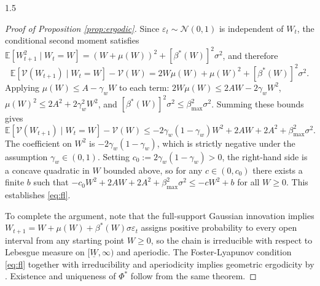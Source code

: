 \documentclass[12pt]{article}
\theoremstyle{definition}
\theoremstyle{plain}
\begin{document}
\begin{spacing}{1.5}
\begin{appendices}
\begin{proof}[Proof of Proposition \ref{prop:ergodic}]
    Since $\varepsilon_t \sim \mathcal{N}(0,1)$ is independent of $W_t$, the conditional second moment satisfies $\mathbb{E}[W_{t+1}^2 \mid W_t = W] = (W + \mu(W))^2 + [\beta^*(W)]^2\sigma^2$, and therefore
    \[
    \mathbb{E}[\mathcal{V}(W_{t+1}) \mid W_t = W] - \mathcal{V}(W) = 2W\mu(W) + \mu(W)^2 + [\beta^*(W)]^2\sigma^2.
    \]
    Applying $\mu(W) \leq A - \gamma_w W$ to each term: $2W\mu(W) \leq 2AW - 2\gamma_w W^2$, $\mu(W)^2 \leq 2A^2 + 2\gamma_w^2 W^2$, and $[\beta^*(W)]^2\sigma^2 \leq \beta_{\max}^2\sigma^2$. Summing these bounds gives
    \[
    \mathbb{E}[\mathcal{V}(W_{t+1}) \mid W_t = W] - \mathcal{V}(W) \leq -2\gamma_w(1-\gamma_w)W^2 + 2AW + 2A^2 + \beta_{\max}^2\sigma^2.
    \]
    The coefficient on $W^2$ is $-2\gamma_w(1-\gamma_w)$, which is strictly negative under the assumption $\gamma_w \in (0,1)$. Setting $c_0 := 2\gamma_w(1-\gamma_w) > 0$, the right-hand side is a concave quadratic in $W$ bounded above, so for any $c \in (0,c_0)$ there exists a finite $b$ such that $-c_0 W^2 + 2AW + 2A^2 + \beta_{\max}^2\sigma^2 \leq -cW^2 + b$ for all $W \geq 0$. This establishes \eqref{eq:fl}.

    To complete the argument, note that the full-support Gaussian innovation implies $W_{t+1} = W + \mu(W) + \beta^*(W)\sigma\varepsilon_t$ assigns positive probability to every open interval from any starting point $W \geq 0$, so the chain is irreducible with respect to Lebesgue measure on $[\underline{W},\infty)$ and aperiodic. The Foster-Lyapunov condition \eqref{eq:fl} together with irreducibility and aperiodicity implies geometric ergodicity by \parencite[Theorem 15.2.5]{meyn2009}. Existence and uniqueness of $\Phi^*$ follow from the same theorem.
    \end{proof}

\end{appendices}

\end{spacing}
\end{document}
